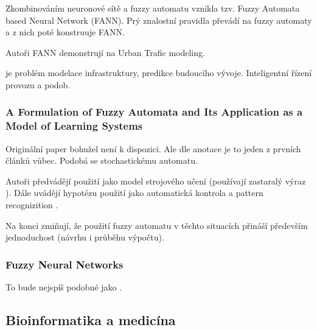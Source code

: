 \documentclass[a4paper,10pt]{article}
\begin{document}
Zkombinováním neuronové sítě a fuzzy automatu vznikla tzv. Fuzzy  Automata  based  Neural  Network (FANN). Prý znalostní pravidla převádí na fuzzy automaty a z nich poté konstruuje FANN.

\begin{definition}
\end{definition}


Autoři FANN demonstrují na Urban Trafic modeling.

\begin{definition}
 je problém modelace infrastruktury, predikce budoucího vývoje. Inteligentní řízení provozu a podob.
\end{definition}

\subsubsection*{A Formulation of Fuzzy Automata and Its Application as a Model of Learning Systems \cite{WeeFu-FormFuzzzAutItsAppModLearSyss}}

Originální paper bohužel není k dispozici. Ale dle anotace je to jeden z prvních článků vůbec. Podobá se stochastickému automatu.

\begin{definition}
\end{definition}

Autoři předvádějí použití  jako model strojového učení (používají zastaralý výraz ). Dále uvádějí hypotézu použití jako automatická kontrola a pattern recognizition .

Na konci zmiňují, že použití fuzzy automatu v těchto situacích přináší především jednoduchost (návrhu i průběhu výpočtu).


\subsubsection*{Fuzzy Neural Networks \cite{LeeLee-FuzzNeuNet}}

To bude nejspíš podobné jako \cite{DarAhmSin-AppFuzzAutTheKnBsNeuNetDevBasLeaMod}. 


\subsection{Bioinformatika a medicína}
\end{document}

